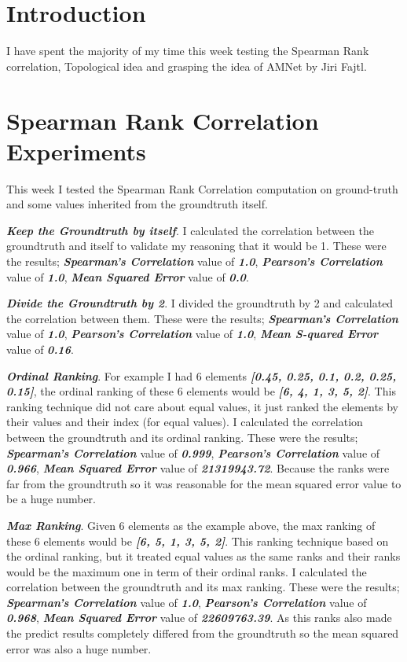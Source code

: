 \section{Introduction}
I have spent the majority of my time this week testing the Spearman Rank correlation, Topological idea and grasping the idea of AMNet\cite{amnet} by Jiri Fajtl.

\section{Spearman Rank Correlation Experiments}
This week I tested the Spearman Rank Correlation computation on ground-truth and some values inherited from the groundtruth itself.

\textbf{\emph{Keep the Groundtruth by itself}}. I calculated the correlation between the groundtruth and itself to validate my reasoning that it would be 1. These were the results; \textbf{\emph{Spearman's Correlation}} value of \textbf{\emph{1.0}}, \textbf{\emph{Pearson's Correlation}} value of \textbf{\emph{1.0}}, \textbf{\emph{Mean Squared Error}} value of \textbf{\emph{0.0}}.

\textbf{\emph{Divide the Groundtruth by 2}}. I divided the groundtruth by 2 and calculated the correlation between them. These were the results; \textbf{\emph{Spearman's Correlation}} value of \textbf{\emph{1.0}}, \textbf{\emph{Pearson's Correlation}} value of \textbf{\emph{1.0}}, \textbf{\emph{Mean S-quared Error}} value of \textbf{\emph{0.16}}.

\textbf{\emph{Ordinal Ranking}}. For example I had 6 elements \textbf{\emph{[0.45, 0.25, 0.1, 0.2, 0.25, 0.15]}}, the ordinal ranking of these 6 elements would be \textbf{\emph{[6, 4, 1, 3, 5, 2]}}. This ranking technique did not care about equal values, it just ranked the elements by their values and their index (for equal values). I calculated the correlation between the groundtruth and its ordinal ranking. These were the results; \textbf{\emph{Spearman's Correlation}} value of \textbf{\emph{0.999}}, \textbf{\emph{Pearson's Correlation}} value of \textbf{\emph{0.966}}, \textbf{\emph{Mean Squared Error}} value of \textbf{\emph{21319943.72}}. Because the ranks were far from the groundtruth so it was reasonable for the mean squared error value to be a huge number.

\textbf{\emph{Max Ranking}}. Given 6 elements as the example above, the max ranking of these 6 elements would be \textbf{\emph{[6, 5, 1, 3, 5, 2]}}. This ranking technique based on the ordinal ranking, but it treated equal values as the same ranks and their ranks would be the maximum one in term of their ordinal ranks. I calculated the correlation between the groundtruth and its max ranking. These were the results; \textbf{\emph{Spearman's Correlation}} value of \textbf{\emph{1.0}}, \textbf{\emph{Pearson's Correlation}} value of \textbf{\emph{0.968}}, \textbf{\emph{Mean Squared Error}} value of \textbf{\emph{22609763.39}}. As this ranks also made the predict results completely differed from the groundtruth so the mean squared error was also a huge number.

